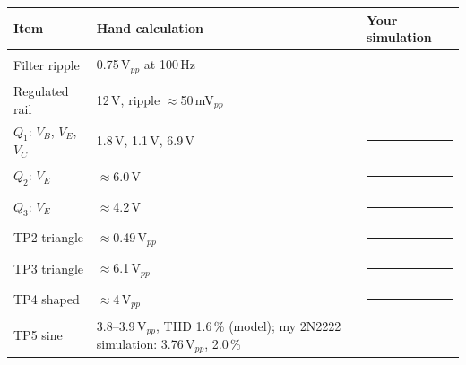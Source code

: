 \begin{center}
\small
\begin{tabular}{@{}lll@{}}
\toprule
Item & Hand calculation & Your simulation \\
\midrule
Filter ripple & 0.75\,V$_{pp}$ at 100\,Hz & \rule{2cm}{0.3pt} \\
Regulated rail & 12\,V, ripple $\approx$50\,mV$_{pp}$ & \rule{2cm}{0.3pt} \\
$Q_1$: $V_B$, $V_E$, $V_C$ & 1.8\,V, 1.1\,V, 6.9\,V & \rule{2cm}{0.3pt} \\
$Q_2$: $V_E$ & $\approx$6.0\,V & \rule{2cm}{0.3pt} \\
$Q_3$: $V_E$ & $\approx$4.2\,V & \rule{2cm}{0.3pt} \\
TP2 triangle & $\approx$0.49\,V$_{pp}$ & \rule{2cm}{0.3pt} \\
TP3 triangle & $\approx$6.1\,V$_{pp}$ & \rule{2cm}{0.3pt} \\
TP4 shaped & $\approx$4\,V$_{pp}$ & \rule{2cm}{0.3pt} \\
TP5 sine & 3.8--3.9\,V$_{pp}$, THD 1.6\,\% (model); my 2N2222 simulation: 3.76\,V$_{pp}$, 2.0\,\% & \rule{2cm}{0.3pt} \\
\bottomrule
\end{tabular}
\end{center}

